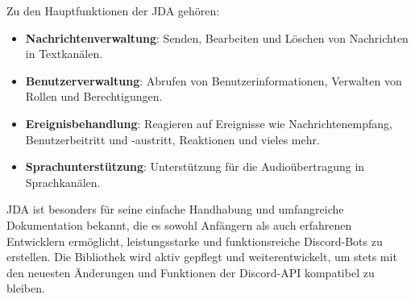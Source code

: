         Zu den Hauptfunktionen der JDA gehören:
        \begin{itemize}
            \item \textbf{Nachrichtenverwaltung}: Senden, Bearbeiten und Löschen von Nachrichten in Textkanälen.
            \item \textbf{Benutzerverwaltung}: Abrufen von Benutzerinformationen, Verwalten von Rollen und Berechtigungen.
            \item \textbf{Ereignisbehandlung}: Reagieren auf Ereignisse wie Nachrichtenempfang, Benutzerbeitritt und -austritt, Reaktionen und vieles mehr.
            \item \textbf{Sprachunterstützung}: Unterstützung für die Audioübertragung in Sprachkanälen.
        \end{itemize}
        
        JDA ist besonders für seine einfache Handhabung und umfangreiche Dokumentation bekannt, die es sowohl Anfängern als auch erfahrenen Entwicklern ermöglicht, leistungsstarke und funktionsreiche Discord-Bots zu erstellen. Die Bibliothek wird aktiv gepflegt und weiterentwickelt, um stets mit den neuesten Änderungen und Funktionen der Discord-API kompatibel zu bleiben.